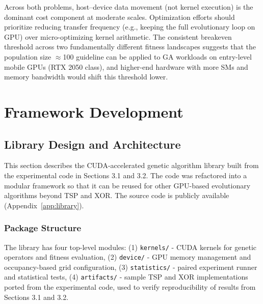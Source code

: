 Across both problems, host--device data movement (not kernel execution) is the dominant cost component at moderate scales. Optimization efforts should prioritize reducing transfer frequency (e.g., keeping the full evolutionary loop on GPU) over micro-optimizing kernel arithmetic. The consistent breakeven threshold across two fundamentally different fitness landscapes suggests that the population size $\approx$100 guideline can be applied to GA workloads on entry-level mobile GPUs (RTX 2050 class), and higher-end hardware with more SMs and memory bandwidth would shift this threshold lower.


\section{Framework Development}

\subsection{Library Design and Architecture}



This section describes the CUDA-accelerated genetic algorithm library built from the experimental code in Sections 3.1 and 3.2. The code was refactored into a modular framework so that it can be reused for other GPU-based evolutionary algorithms beyond TSP and XOR. The source code is publicly available (Appendix~\ref{app:library}).

\subsubsection*{Package Structure} The library has four top-level modules:
(1) \texttt{kernels/} - CUDA kernels for genetic operators and fitness evaluation,
(2) \texttt{device/} - GPU memory management and occupancy-based grid configuration,
(3) \texttt{statistics/} - paired experiment runner and statistical tests,
(4) \texttt{artifacts/} - sample TSP and XOR implementations ported from the experimental code, used to verify reproducibility of results from Sections 3.1 and 3.2.

